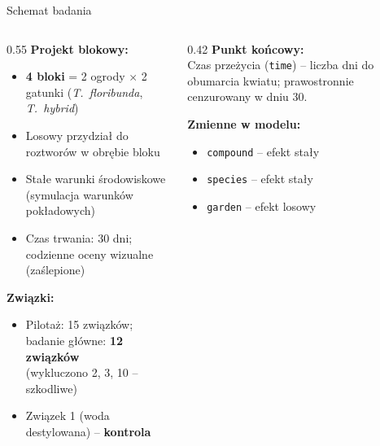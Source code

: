 \documentclass[aspectratio=169, 12pt]{beamer}
\begin{document}
\begin{frame}{Schemat badania}
    \begin{columns}
        \begin{column}{0.55\textwidth}
            \textbf{Projekt blokowy:}
            \begin{itemize}
                \item \textbf{4 bloki} = 2 ogrody $\times$ 2 gatunki (\textit{T.~floribunda}, \textit{T.~hybrid})
                \item Losowy przydział do roztworów w obrębie bloku
                \item Stałe warunki środowiskowe (symulacja warunków pokładowych)
                \item Czas trwania: 30 dni; codzienne oceny wizualne (zaślepione)
            \end{itemize}
            \vspace{0.4em}
            \textbf{Związki:}
            \begin{itemize}
                \item Pilotaż: 15 związków; badanie główne: \textbf{12 związków}\\
                      (wykluczono 2, 3, 10 -- szkodliwe)
                \item Związek 1 (woda destylowana) -- \textbf{kontrola}
            \end{itemize}
        \end{column}
        \begin{column}{0.42\textwidth}
            \textbf{Punkt końcowy:}\\[0.4em]
            Czas przeżycia (\texttt{time}) -- liczba dni do obumarcia kwiatu; prawostronnie cenzurowany w dniu 30.

            \vspace{0.8em}
            \textbf{Zmienne w modelu:}
            \begin{itemize}
                \item \texttt{compound} -- efekt stały
                \item \texttt{species} -- efekt stały
                \item \texttt{garden} -- efekt losowy
            \end{itemize}
        \end{column}
    \end{columns}
\end{frame}
\end{document}
